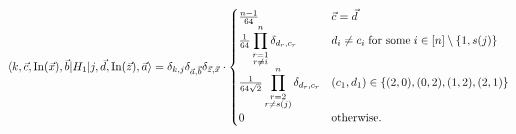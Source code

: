 \documentclass[../thesis-main/thesis-main]{subfiles}
\begin{document}
\begin{mdframed}[frametitle=Matrix elements of $H_{1}$]
\begin{equation}
\langle k,\vec{c},\operatorname{In}(\vec{x}),\vec{b}|H_{1}|j,\vec{d},\operatorname{In}(\vec{z}),\vec{a}\rangle=\delta_{k,j}\delta_{\vec{a},\vec{b}}\delta_{\vec{z},\vec{x}}\cdot\begin{cases}
\frac{n-1}{64} & \vec{c}=\vec{d}\\
\frac{1}{64}\displaystyle\prod_{\substack{r=1\\r\neq i}}^n
\delta_{d_{r},c_{r}} & d_{i}\neq c_{i}\;\text{for some}\; i\in[n]\setminus\{1,s(j)\}\\
\frac{1}{64\sqrt{2}} \displaystyle\prod_{\substack{r=2\\r\neq s(j)}}^n \delta_{d_{r},c_{r}} & (c_{1},d_{1})\in\{(2,0),(0,2),(1,2),(2,1)\}\\
0 & \text{otherwise.}
\end{cases}\label{eq:H1_goodbasis-1}
\end{equation}
\end{mdframed}
\end{document}
